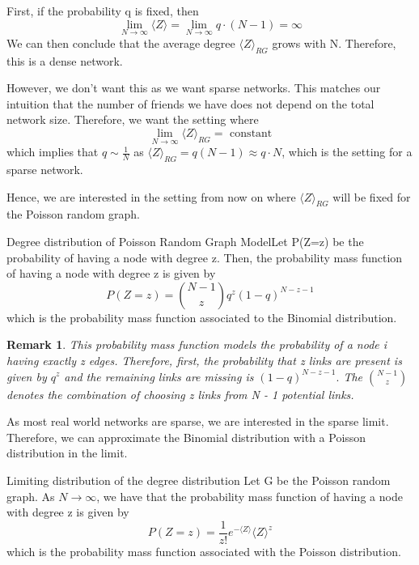 \documentclass[twoside]{article}
\newtheorem{remark}[theorem]{Remark}
\begin{document}
First, if the probability q is fixed, then 
$$
\lim_{N \rightarrow \infty}\langle Z \rangle = \lim_{N \rightarrow \infty}q\cdot(N - 1) = \infty $$
We can then conclude that the average degree $\langle Z \rangle_{RG}$ grows with N. Therefore, this is a dense network. 


However, we don't want this as we want sparse networks. This matches our intuition that the number of friends we have does not depend on the total network size. Therefore, we want the setting where
$$
\lim_{N \rightarrow \infty}\langle Z \rangle_{RG} = \text{ constant}
$$
which implies that $q \sim \frac{1}{N}$ as $\langle Z \rangle_{RG} = q(N - 1) \approx q \cdot N$, which is the setting for a sparse network.

Hence, we are interested in the setting from now on where $\langle Z \rangle_{RG}$ will be fixed for the Poisson random graph.

\begin{proposition_exam}{Degree distribution of Poisson Random Graph Model}{}Let P(Z=z) be the probability of having a node with degree z. Then, the probability mass function of having a node with degree z is given by
$$
P(Z=z) = {N - 1 \choose z}q^z(1 - q)^{N - z - 1}
$$
which is the probability mass function associated to the Binomial distribution. 
\end{proposition_exam}

\begin{remark} This probability mass function models the probability of a node i having exactly z edges. Therefore, first, the probability that z links are present is given by $q^z$ and the remaining links are missing is $(1 - q)^{N - z - 1}.$ The ${N - 1 \choose z}$ denotes the combination of choosing z links from N - 1 potential links. 
\end{remark}

As most real world networks are sparse, we are interested in the sparse limit. Therefore, we can approximate the Binomial distribution with a Poisson distribution in the limit.

\begin{theorem_exam}{Limiting distribution of the degree distribution}{} Let G be the Poisson random graph. As $N \rightarrow \infty$, we have that the probability mass function of having a node with degree z is given by
$$
P(Z=z) = \frac{1}{z!}e^{-\langle Z \rangle}\langle Z \rangle^z
$$
which is the probability mass function associated with the Poisson distribution.
\end{theorem_exam}
\end{document}

